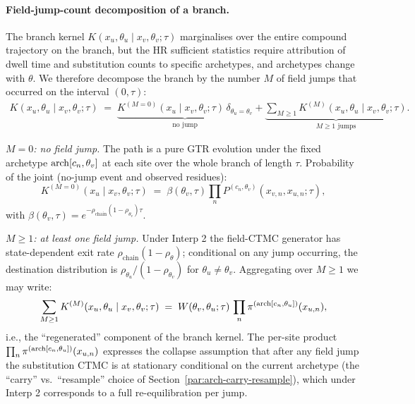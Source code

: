 \paragraph{Field-jump-count decomposition of a branch.}
\label{par:arch-phylo-elbo-jumps}

The branch kernel $K(x_u, \theta_u \mid x_v, \theta_v; \tau)$ marginalises
over the entire compound trajectory on the branch, but the HR sufficient
statistics require attribution of dwell time and substitution counts
to specific archetypes, and archetypes change with $\theta$. We therefore
decompose the branch by the number $M$ of field jumps that occurred on
the interval $(0, \tau)$:
\begin{align}
K(x_u, \theta_u \mid x_v, \theta_v; \tau) \;=\;
    \underbrace{K^{(M=0)}(x_u \mid x_v, \theta_v; \tau)\,\delta_{\theta_u = \theta_v}}_{\text{no jump}}
    +\underbrace{\sum_{M \geq 1} K^{(M)}(x_u, \theta_u \mid x_v, \theta_v; \tau)}_{\text{$M \geq 1$ jumps}}.
\end{align}

\emph{$M = 0$: no field jump.} The path is a pure GTR evolution under
the fixed archetype $\mathrm{arch}[c_n, \theta_v]$ at each site over the whole
branch of length $\tau$. Probability of the joint (no-jump event and
observed residues):
\begin{equation}
K^{(M=0)}(x_u \mid x_v, \theta_v; \tau)
    \;=\; \beta(\theta_v, \tau) \prod_n P^{(c_n, \theta_v)}(x_{v, n}, x_{u, n}; \tau),
    \label{eq:arch-elbo-KM0}
\end{equation}
with $\beta(\theta_v, \tau) = e^{-\rho_{\text{chain}}(1 - \rho_{\theta_v})\tau}$.

\emph{$M \geq 1$: at least one field jump.} Under Interp 2 the
field-CTMC generator has state-dependent exit rate $\rho_{\text{chain}}
(1 - \rho_{\theta})$; conditional on any jump occurring, the destination
distribution is $\rho_{\theta_u} / (1 - \rho_{\theta_v})$ for
$\theta_u \neq \theta_v$. Aggregating over $M \geq 1$ we may write:
\begin{equation}
\sum_{M \geq 1} K^{(M)}(x_u, \theta_u \mid x_v, \theta_v; \tau)
    \;=\;
    W(\theta_v, \theta_u; \tau)
    \, \prod_n \pi^{(\mathrm{arch}[c_n, \theta_u])}(x_{u, n}),
    \label{eq:arch-elbo-KM1}
\end{equation}
i.e., the ``regenerated'' component of the branch kernel. The
per-site product $\prod_n \pi^{(\mathrm{arch}[c_n, \theta_u])}(x_{u, n})$
expresses the collapse assumption that after any field jump the
substitution CTMC is at stationary conditional on the current
archetype (the ``carry'' vs.\ ``resample'' choice of Section~\ref{par:arch-carry-resample}),
which under Interp 2 corresponds to a full re-equilibration per jump.

